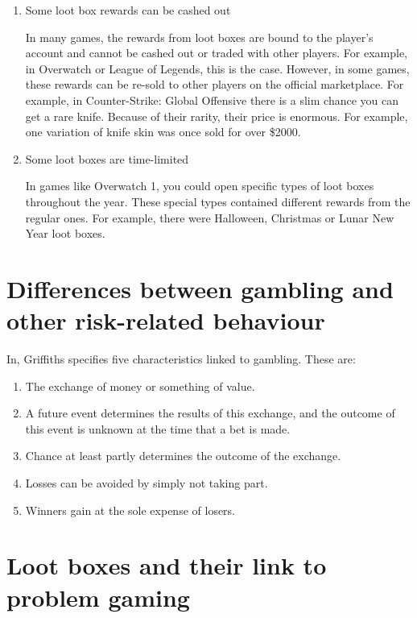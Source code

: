\documentclass[10pt,oneside,english,a4paper]{article}
\begin{document}
\begin{enumerate}
\item Some loot box rewards can be cashed out

	In many games, the rewards from loot boxes are bound to the player's account and cannot be cashed out or traded with other players. For example, in Overwatch or League of Legends, this is the case. However, in some games, these rewards can be re-sold to other players on the official marketplace. For example, in Counter-Strike: Global Offensive there is a slim chance you can get a rare knife. Because of their rarity, their price is enormous. For example, one variation of knife skin was once sold for over \$2000. \cite{csgo:knives}

\item Some loot boxes are time-limited
	
	In games like Overwatch 1, you could open specific types of loot boxes throughout the year. These special types contained different rewards from the regular ones. For example, there were Halloween, Christmas or Lunar New Year loot boxes. 

\end{enumerate}

\section{Differences between gambling and other risk-related behaviour} \label{sec:griffiths}

In\cite{gambling:characteristics}, Griffiths specifies five characteristics linked to gambling. These are:

\begin{enumerate}

\item The exchange of money or something of value.
\item A future event determines the results of this exchange, and the outcome of this event is unknown at the time that a bet is made.
\item Chance at least partly determines the outcome of the exchange.
\item Losses can be avoided by simply not taking part.
\item Winners gain at the sole expense of losers.

\end{enumerate}
	

\section{Loot boxes and their link to problem gaming} \label{sec:link}
\end{document}
